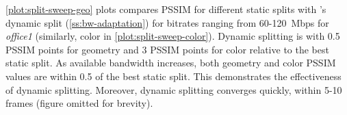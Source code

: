 %
%
%
%
%
%
\cref{plot:split-sweep-geo} plots compares PSSIM for different static splits with \sysname{}'s dynamic split (\cref{ss:bw-adaptation}) for bitrates ranging from 60-120~Mbps for \textit{office1} (similarly, color in \cref{plot:split-sweep-color}).
%
Dynamic splitting is with 0.5 PSSIM points for geometry and 3 PSSIM points for color relative to the best static split.
%
As available bandwidth increases, both geometry and color PSSIM values are within 0.5 of the best static split.
%
This demonstrates the effectiveness of dynamic splitting.
%
%
Moreover, dynamic splitting converges quickly, within 5-10 frames (figure omitted for brevity).
%
%

